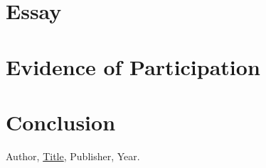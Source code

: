 \documentclass{article}
\theoremstyle{theorem}
\theoremstyle{definition}
\theoremstyle{remark}
\begin{document}
\section{Essay}

\section{Evidence of Participation}

\section{Conclusion}\label{conclusion}

\begin{thebibliography}{99}
 Author, \href{https://en.wikipedia.org/wiki/LaTeX}{Title}, Publisher, Year.
\end{thebibliography}
\end{document}
